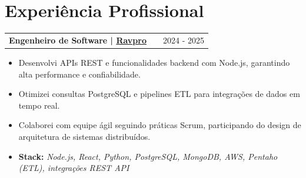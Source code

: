 \documentclass[a4paper,12pt]{article}
\makeatletter
\newenvironment{joblong}[2]
{
    \begin{tabularx}{\linewidth}{@{}l X r@{}}
        \textbf{#1} & \hfill & #2 \\[3.75pt]
    \end{tabularx}
    \begin{minipage}[t]{\linewidth}
    }
    {
    \end{minipage}
}
\newenvironment{bullets}
{
    \begin{itemize}[nosep,after=\strut, leftmargin=1em, itemsep=3pt,label=--]
    }
    {
    \end{itemize}
}
\makeatother
\begin{document}


    \section{Experiência Profissional}


    \begin{joblong}{Engenheiro de Software | \href{https://ravpro.com.br}{\textbf{Ravpro}}}{2024 - 2025}
        \begin{bullets}
            \item Desenvolvi APIs REST e funcionalidades backend com Node.js, garantindo alta performance e confiabilidade.
            \item Otimizei consultas PostgreSQL e pipelines ETL para integrações de dados em tempo real.
            \item Colaborei com equipe ágil seguindo práticas Scrum, participando do design de arquitetura de sistemas distribuídos.
            \item \textbf{Stack:} \textit{Node.js, React, Python, PostgreSQL, MongoDB, AWS, Pentaho (ETL), integrações REST API}
        \end{bullets}
    \end{joblong}
\end{document}
